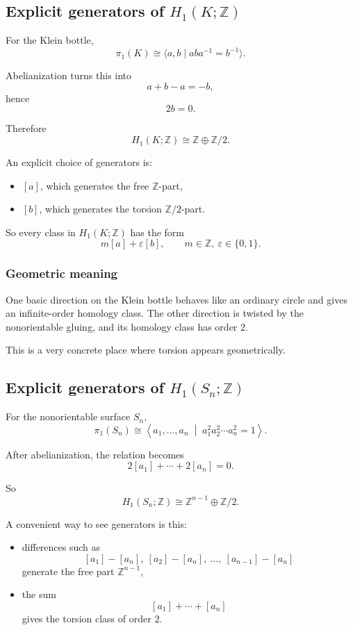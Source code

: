 \documentclass[12pt,a4paper]{article}
\newcommand{\Z}{\mathbb{Z}}
\theoremstyle{notespace}
\begin{document}
\subsection{Explicit generators of \(H_1(K;\Z)\)}

For the Klein bottle,
\[
\pi_1(K)\cong \langle a,b\mid aba^{-1}=b^{-1}\rangle.
\]

Abelianization turns this into
\[
a+b-a=-b,
\]
hence
\[
2b=0.
\]

Therefore
\[
H_1(K;\Z)\cong \Z\oplus \Z/2.
\]

An explicit choice of generators is:
\begin{itemize}
	\item \([a]\), which generates the free \(\Z\)-part,
	\item \([b]\), which generates the torsion \(\Z/2\)-part.
\end{itemize}

So every class in \(H_1(K;\Z)\) has the form
\[
m[a]+\varepsilon [b],\qquad m\in \Z,\ \varepsilon\in\{0,1\}.
\]

\subsubsection*{Geometric meaning}

One basic direction on the Klein bottle behaves like an ordinary circle and gives an infinite-order homology class. The other direction is twisted by the nonorientable gluing, and its homology class has order \(2\).

This is a very concrete place where torsion appears geometrically.

\subsection{Explicit generators of \(H_1(S_n;\Z)\)}

For the nonorientable surface \(S_n\),
\[
\pi_1(S_n)\cong
\left\langle
a_1,\dots,a_n
\;\middle|\;
a_1^2a_2^2\cdots a_n^2=1
\right\rangle.
\]

After abelianization, the relation becomes
\[
2[a_1]+\cdots+2[a_n]=0.
\]

So
\[
H_1(S_n;\Z)\cong \Z^{n-1}\oplus \Z/2.
\]

A convenient way to see generators is this:
\begin{itemize}
	\item differences such as
	\[
	[a_1]-[a_n],\ [a_2]-[a_n],\ \dots,\ [a_{n-1}]-[a_n]
	\]
	generate the free part \(\Z^{n-1}\),
	\item the sum
	\[
	[a_1]+\cdots+[a_n]
	\]
	gives the torsion class of order \(2\).
\end{itemize}
\end{document}

